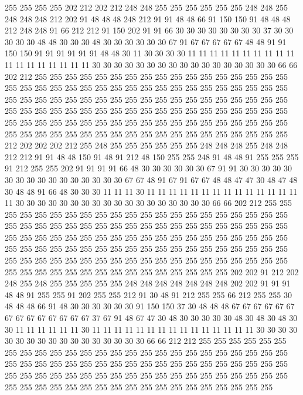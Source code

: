255 255 255 255 202 212 202 212 248 248 255 255 255 255 255 255 248 248 255 248
248 248 212 202 91 48 48 48 248 212 91 91 48 48 66 91 150 150 91 48
48 48 212 248 248 91 66 212 212 91 150 202 91 91 66 30 30 30 30 30
30 30 30 37 30 30 30 30 30 48 48 30 30 30 48 30 30 30 30 30
30 67 91 67 67 67 67 67 48 48 91 91 150 150 91 91 91 91 91 91
48 48 30 11 30 30 30 30 11 11 11 11 11 11 11 11 11 11 11 11
11 11 11 11 11 11 30 30 30 30 30 30 30 30 30 30 30 30 30 30
30 30 30 66 66 202 212 255 255 255 255 255 255 255 255 255 255 255 255 255
255 255 255 255 255 255 255 255 255 255 255 255 255 255 255 255 255 255 255 255
255 255 255 255 255 255 255 255 255 255 255 255 255 255 255 255 255 255 255 255
255 255 255 255 255 255 255 255 255 255 255 255 255 255 255 255 255 255 255 255
255 255 255 255 255 255 255 255 255 255 255 255 255 255 255 255 255 255 255 255
255 255 255 255 255 255 255 255 255 255 255 255 255 255 255 255 255 255 255 212
202 202 202 212 255 248 255 255 255 255 255 255 248 248 248 255 248 248 212 212
91 91 48 48 150 91 48 91 212 48 150 255 255 248 91 48 48 91 255 255
255 91 212 255 255 202 91 91 91 91 66 48 30 30 30 30 30 30 67 91
91 30 30 30 30 30 30 30 30 30 30 30 30 30 30 30 30 67 67 48
91 67 91 67 67 48 48 47 47 30 48 47 48 30 48 48 91 66 48 30
30 30 11 11 11 30 11 11 11 11 11 11 11 11 11 11 11 11 11 11
11 30 30 30 30 30 30 30 30 30 30 30 30 30 30 30 30 30 30 66
66 202 212 255 255 255 255 255 255 255 255 255 255 255 255 255 255 255 255 255
255 255 255 255 255 255 255 255 255 255 255 255 255 255 255 255 255 255 255 255
255 255 255 255 255 255 255 255 255 255 255 255 255 255 255 255 255 255 255 255
255 255 255 255 255 255 255 255 255 255 255 255 255 255 255 255 255 255 255 255
255 255 255 255 255 255 255 255 255 255 255 255 255 255 255 255 255 255 255 255
255 255 255 255 255 255 255 255 255 255 255 255 255 255 255 202 202 91 212 202
248 255 248 255 255 255 255 255 248 248 248 248 248 248 248 202 202 91 91 91
48 48 91 255 255 91 202 255 255 212 91 30 48 91 212 255 255 66 212 255
255 30 48 48 48 66 91 48 30 30 30 30 30 30 91 150 150 37 30 48
48 48 67 67 67 67 67 67 67 67 67 67 67 67 67 67 37 67 91 48
67 47 30 48 30 30 30 30 30 48 30 48 30 48 30 30 11 11 11 11
11 11 30 11 11 11 11 11 11 11 11 11 11 11 11 11 11 11 30 30
30 30 30 30 30 30 30 30 30 30 30 30 30 30 30 66 66 212 212 255
255 255 255 255 255 255 255 255 255 255 255 255 255 255 255 255 255 255 255 255
255 255 255 255 255 255 255 255 255 255 255 255 255 255 255 255 255 255 255 255
255 255 255 255 255 255 255 255 255 255 255 255 255 255 255 255 255 255 255 255
255 255 255 255 255 255 255 255 255 255 255 255 255 255 255 255 255 255 255 255
